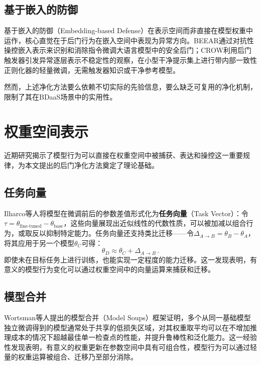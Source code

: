 \subsection{基于嵌入的防御}

{\sloppy 
基于嵌入的防御（Embedding-based Defense）在表示空间而非直接在模型权重中运作，核心直觉在于后门行为在嵌入空间中表现为异常方向。BEEAR\cite{zeng2024beear}通过对抗性操控嵌入表示来识别和消除指令微调大语言模型中的安全后门；CROW\cite{min2024crow}利用后门触发器引发异常逐层表示不稳定性的观察，在小型干净提示集上进行带内部一致性正则化器的轻量微调，无需触发器知识或干净参考模型。
\par}
然而，上述净化方法要么依赖不切实际的先验信息，要么缺乏可复用的净化机制，限制了其在BDaaS场景中的实用性。

\section{权重空间表示}

近期研究揭示了模型行为可以直接在权重空间中被捕获、表达和操控这一重要规律，为本文提出的后门净化方法奠定了理论基础。

\subsection{任务向量}

Ilharco等人\cite{ilharco2023taskv}将模型在微调前后的参数差值形式化为\textbf{任务向量}（Task Vector）：令$\tau = \theta_{\text{fine-tuned}} - \theta_{\text{base}}$，这些向量展现出近似线性的代数性质，可以被加减以组合行为，或取反以抑制特定能力。任务向量还支持类比迁移——令$\Delta_{A \to B} = \theta_B - \theta_A$，将其应用于另一个模型$\theta_C$可得：
\begin{equation}
\theta_D \approx \theta_C + \Delta_{A \to B} \, .
\end{equation}
即使未在目标任务上进行训练，也能实现一定程度的能力迁移。这一发现表明，有意义的模型行为变化可以通过权重空间中的向量运算来捕获和迁移。

\subsection{模型合并}

Wortsman等人\cite{wortsman2022soups}提出的模型合并（Model Soups）框架证明，多个从同一基础模型独立微调得到的模型通常处于共享的低损失区域，对其权重取平均可以在不增加推理成本的情况下超越最佳单一检查点的性能，并提升鲁棒性和泛化能力。这一经验性发现表明，有意义的权重更新在参数空间中具有可组合性，模型行为可以通过轻量的权重运算被组合、迁移乃至部分消除。

